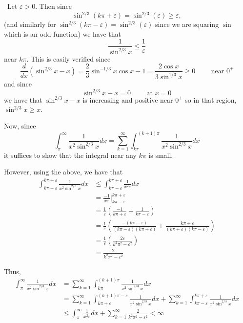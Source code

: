 \documentclass[12pt]{Qual}
\begin{document}
\begin{solution}$\,$
Let $\varepsilon>0$. Then since $$\sin^{2/3}(k\pi+\varepsilon)=\sin^{2/3}(\varepsilon)\ge\varepsilon,$$ (and similarly for $\sin^{2/3}(k\pi-\varepsilon)=\sin^{2/3}(\varepsilon)$ since we are squaring $\sin$ which is an odd function) we have that $$\frac{1}{\sin^{2/3}x}\le\frac{1}{\varepsilon}$$ near $k\pi$. This is easily verified since $$\frac{d}{dx}(\sin^{2/3}x-x)=\frac{2}{3}\sin^{-1/3}x\cos x-1=\frac{2\cos x}{3\sin^{1/3}x}\ge0\qquad\text{ near }0^+$$ and since $$\sin^{2/3}x-x=0\qquad\text{ at }x=0$$ we have that $\sin^{2/3}x-x$ is increasing and positive near $0^+$ so in that region, $\sin^{2/3}x\ge x$.

Now, since $$\int_\pi^\infty\frac{1}{x^2\sin^{2/3}x}dx=\sum_{k=1}^\infty\int_{k\pi}^{(k+1)\pi}\frac{1}{x^2\sin^{2/3}x}dx$$ it suffices to show that the integral near any $k\pi$ is small.

However, using the above, we have that
\begin{align*}
    \int_{k\pi-\varepsilon}^{k\pi+\varepsilon}\frac{1}{x^2\sin^{2/3}x}dx&\le\int_{k\pi-\varepsilon}^{k\pi+\varepsilon}\frac{1}{x^2\varepsilon}dx\\
    &=\frac{-1}{x\varepsilon}\bigg|_{k\pi-\varepsilon}^{k\pi+\varepsilon}\\
    &=\frac{1}{\varepsilon}\left(\frac{-1}{k\pi+\varepsilon}+\frac{1}{k\pi-\varepsilon}\right)\\
    &=\frac{1}{\varepsilon}\left(\frac{-(k\pi-\varepsilon)}{(k\pi-\varepsilon)(k\pi+\varepsilon)}+\frac{k\pi+\varepsilon}{(k\pi+\varepsilon)(k\pi-\varepsilon)}\right)\\
    &=\frac{1}{\varepsilon}\left(\frac{2\varepsilon}{k^2\pi^2-\varepsilon^2}\right)\\
    &=\frac{2}{k^2\pi^2-\varepsilon^2}
\end{align*}

Thus, \begin{align*}
    \int_\pi^\infty\frac{1}{x^2\sin^{2/3}x}dx&=\sum_{k=1}^\infty\int_{k\pi}^{(k+1)\pi}\frac{1}{x^2\sin^{2/3}x}dx\\
    &=\sum_{k=1}^\infty\int_{k\pi+\varepsilon}^{(k+1)\pi-\varepsilon}\frac{1}{x^2\sin^{2/3}x}dx+\sum_{k=1}^\infty\int_{k\pi-\varepsilon}^{k\pi+\varepsilon}\frac{1}{x^2\sin^{2/3}x}dx\\
    &\le\int_\pi^\infty\frac{1}{x^2\varepsilon}dx+\sum_{k=1}^\infty\frac{2}{k^2\pi^2-\varepsilon^2}<\infty
\end{align*}

\end{solution}
\newpage
\end{document}
